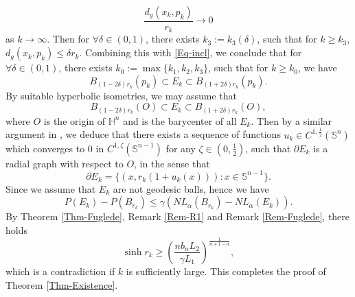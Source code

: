 \documentclass[11pt,reqno]{amsart}
\theoremstyle{definition}
\theoremstyle{remark}
\numberwithin{equation}{section}
\renewcommand{\(}{\left(}
\renewcommand{\)}{\right)}
\renewcommand{\-}{\overline}
\begin{document}
\begin{equation*}
	\frac{d_g(x_k,p_k)}{r_k}\to 0
\end{equation*}
as $k\to\infty$. Then for $\forall\delta\in(0,1)$, there exists $k_3:=k_3(\delta)$, such that for $k\geq k_3$, $d_g(x_k,p_k)\leq \delta r_k$. Combining this with \eqref{Eq-incl}, we conclude that for $\forall \delta\in(0,1)$, there exists $k_0:=\max\{k_1,k_2,k_3\}$, such that for $k\geq k_0$, we have
\begin{equation*}
	B_{(1-2\delta)r_k}(p_k)\subset E_k\subset  B_{(1+2\delta)r_k}(p_k).
\end{equation*}
By suitable hyperbolic isometries, we may assume that 
\begin{equation}\label{Eq-twi2}
	B_{(1-2\delta)r_k}(O)\subset E_k\subset  B_{(1+2\delta)r_k}(O),
\end{equation}
where $O$ is the origin of $\mathbb{H}^n$ and is the barycenter of all $E_k$. Then by a similar argument in \cite[\S 6.6.2]{Bogelein15}, we deduce that there exists a sequence of functions $u_k\in C^{1,\frac{1}{2}}(\mathbb{S}^n)$ which converges to 0 in $C^{1,\zeta}(\mathbb{S}^{n-1})$ for any $\zeta\in(0,\frac{1}{2})$, such that $\partial E_k$ is a radial graph with respect to $O$, in the sense that  
\begin{equation}
		\partial E_k=\{(x,r_k(1+u_k(x))):x\in\mathbb{S}^{n-1}\}.
\end{equation}
Since we assume that $E_k$ are not geodesic balls, hence we have
\begin{equation}\label{Eq-Q0}
	P(E_k)-P(B_{r_k})\leq \gamma(NL_{\alpha}(B_{r_k})-NL_{\alpha}(E_k)).
\end{equation}
By Theorem \ref{Thm-Fuglede}, Remark \ref{Rem-R1} and Remark \ref{Rem-Fuglede}, there holds
\begin{equation*}
\sinh r_k\geq\left(\frac{nb_n L_2}{\gamma L_1}\right)^{\frac{1}{n+1-\alpha}},
\end{equation*}
which is a contradiction if $k$ is sufficiently large. This completes the proof of Theorem \ref{Thm-Existence}.
\end{document}
